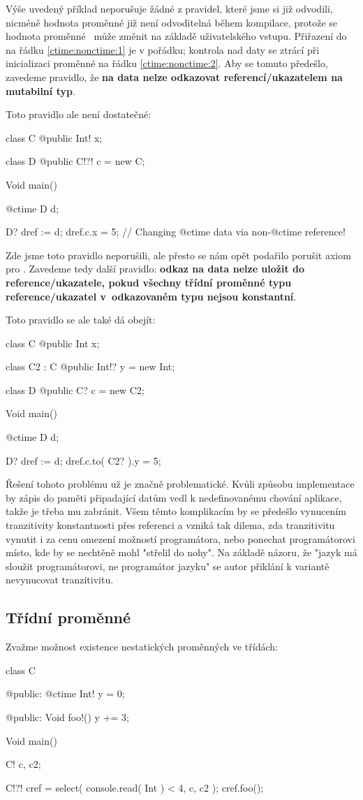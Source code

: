 Výše uvedený příklad neporušuje žádné z pravidel, které jsme si již odvodili, nicméně hodnota proměnné  již není odvoditelná během kompilace, protože se hodnota proměnné ~může změnit na základě uživatelského vstupu. Přiřazení do  na řádku \ref{ctime:nonctime:1} je v pořádku; kontrola nad daty se ztrácí při inicializaci proměnné  na řádku \ref{ctime:nonctime:2}. Aby se tomuto předešlo, zavedeme pravidlo, že \textbf{na \ctime data nelze odkazovat \nonctime referencí/ukazatelem na mutabilní typ}.

Toto pravidlo ale není dostatečné:
\begin{code}
class C {
	@public Int! x;
}

class D {
	@public C!?! c = new C;
}

Void main() {
	@ctime D d;
	
	D? dref := d;
	dref.c.x = 5; // Changing @ctime data via non-@ctime reference!
}
\end{code}

Zde jsme toto pravidlo neporušili, ale přesto se nám opět podařilo porušit axiom pro \ctime. Zavedeme tedy další pravidlo: \textbf{odkaz na \ctime data nelze uložit do \nonctime reference/ukazatele, pokud všechny třídní proměnné typu reference/ukazatel v~odkazovaném typu nejsou konstantní}.

Toto pravidlo se ale také dá obejít:
\begin{code}
class C {
	@public Int x;
}

class C2 : C {
	@public Int!? y = new Int;
}

class D {
	@public C? c = new C2;
}

Void main() {
	@ctime D d;
	
	D? dref := d;
	dref.c.to( C2? ).y = 5;
}
\end{code}

Řešení tohoto problému už je značně problematické. Kvůli způsobu implementace by zápis do paměti připadající \ctime datům vedl k nedefinovanému chování aplikace, takže je třeba mu zabránit. Všem těmto komplikacím by se předešlo vynucením tranzitivity konstantnosti přes referenci a vzniká tak dilema, zda tranzitivitu vynutit i za cenu omezení možností programátora, nebo ponechat programátorovi místo, kde by se nechtěně mohl "střelil do nohy". Na základě názoru, že "jazyk má sloužit programátorovi, ne programátor jazyku" se autor přiklání k variantě nevynucovat tranzitivitu.

\subsection{Třídní \ctime proměnné}
Zvažme možnost existence nestatických \ctime proměnných ve třídách:
\begin{code}
class C {
	
@public:
	@ctime Int! y = 0;
	
@public:
	Void foo!() {
		y += 3;
	}
	
}

Void main() {
	C! c, c2;
	
	C!?! cref = select( console.read( Int ) < 4, c, c2 );
	cref.foo();
}
\end{code}


